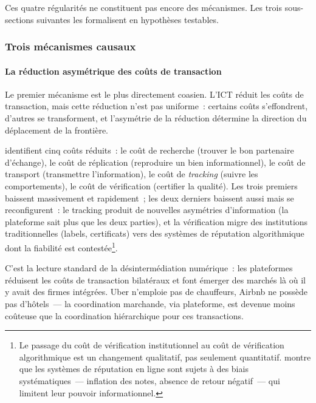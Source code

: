 Ces quatre régularités ne constituent pas encore des mécanismes. Les trois sous-sections suivantes les formalisent en hypothèses testables.


\subsubsection{Trois mécanismes causaux}

\paragraph{La réduction asymétrique des coûts de transaction}

\markINST \markNEO
Le premier mécanisme est le plus directement coasien. L'ICT réduit les coûts de transaction, mais cette réduction n'est pas uniforme~: certains coûts s'effondrent, d'autres se transforment, et l'asymétrie de la réduction détermine la direction du déplacement de la frontière.

\textcite{goldfarb_digital_2019} identifient cinq coûts réduits~: le coût de recherche (trouver le bon partenaire d'échange), le coût de réplication (reproduire un bien informationnel), le coût de transport (transmettre l'information), le coût de \emph{tracking} (suivre les comportements), le coût de vérification (certifier la qualité). Les trois premiers baissent massivement et rapidement~; les deux derniers baissent aussi mais se reconfigurent~: le tracking produit de nouvelles asymétries d'information (la plateforme sait plus que les deux parties), et la vérification migre des institutions traditionnelles (labels, certificats) vers des systèmes de réputation algorithmique dont la fiabilité est contestée\footnote{Le passage du coût de vérification institutionnel au coût de vérification algorithmique est un changement qualitatif, pas seulement quantitatif. \textcite{tadelis_reputation_2016} montre que les systèmes de réputation en ligne sont sujets à des biais systématiques~--- inflation des notes, absence de retour négatif~--- qui limitent leur pouvoir informationnel.}.

 C'est la lecture standard de la désintermédiation numérique~: les plateformes réduisent les coûts de transaction bilatéraux et font émerger des marchés là où il y avait des firmes intégrées. Uber n'emploie pas de chauffeurs, Airbnb ne possède pas d'hôtels~--- la coordination marchande, via plateforme, est devenue moins coûteuse que la coordination hiérarchique pour ces transactions.

